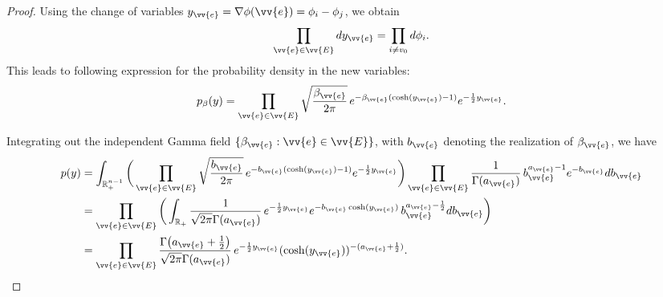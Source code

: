 \documentclass[a4paper, 11pt]{article}
\begin{document}
\begin{proof}
Using the change of variables \( y_{\vv{e}} = \nabla \phi(\vv{e}) = \phi_i - \phi_j \), we obtain
\[
\prod_{\vv{e} \in \vv{E}} dy_{\vv{e}} = \prod_{i \neq v_0} d\phi_i.
\]
This leads to following expression for the probability density in the new variables:
\[
p_{\beta}(y)= \prod_{\vv{e} \in \vv{E}} \sqrt{\frac{\beta_{\vv{e}}}{2\pi}} \, e^{-\beta_{\vv{e}}(\cosh(y_{\vv{e}}) - 1)} e^{-\frac{1}{2} y_{\vv{e}}}.
\]

Integrating out the independent Gamma field $\{\beta_{\vv{e}}: \vv{e}\in \vv{E}\}$, with $b_{\vv{e}}$ denoting the realization of $\beta_{\vv{e}}$, we have
\begin{equation*}
\begin{aligned}
    p(y)
    &= \int_{\mathbb{R}_+^{n-1}}\bigg(\prod_{\vv{e}\in \vv{E}}\sqrt{\frac{b_{\vv{e}}}{2\pi}} \,e^{-b_{\vv{e}}(\cosh(y_{\vv{e}})-1)} e^{-\frac{1}{2}y_{\vv{e}}}\bigg)\prod_{\vv{e}\in \vv{E}}\frac{1}{\Gamma(a_{\vv{e}})}\,b_{\vv{e}}^{a_{\vv{e}}-1}e^{-b_{\vv{e}}} db_{\vv{e}}\\
    &= \prod_{\vv{e}\in \vv{E}}\bigg(\int_{\mathbb{R}_+}\frac{1}{\sqrt{2\pi}\Gamma(a_{\vv{e}})} \,e^{-\frac{1}{2}y_{\vv{e}}} e^{-b_{\vv{e}}\cosh(y_{\vv{e}})} \,b_{\vv{e}}^{a_{\vv{e}}-\frac{1}{2}} db_{\vv{e}}\bigg)\\
    &= \prod_{\vv{e}\in \vv{E}}\frac{\Gamma\big(a_{\vv{e}}+\frac{1}{2}\big)}{\sqrt{2\pi}\Gamma(a_{\vv{e}})} \,e^{-\frac{1}{2}y_{\vv{e}}} (\cosh(y_{\vv{e}}))^{-(a_{\vv{e}}+\frac{1}{2})}.
\end{aligned}
\end{equation*}



\end{proof}
\end{document}
